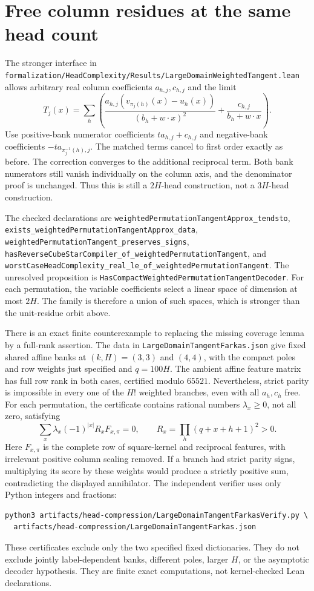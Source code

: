 \documentclass[11pt]{article}
\begin{document}
\section{Free column residues at the same head count}
The stronger interface in
\texttt{formalization/HeadComplexity/Results/LargeDomainWeightedTangent.lean}
allows arbitrary real column coefficients $a_{h,j},c_{h,j}$ and the limit
\[
 T_j(x)=\sum_h\left(
 \frac{a_{h,j}(v_{\pi_j(h)}(x)-u_h(x))}{(b_h+w\cdot x)^2}
 +\frac{c_{h,j}}{b_h+w\cdot x}\right).
\]
Use positive-bank numerator coefficients $t a_{h,j}+c_{h,j}$ and
negative-bank coefficients $-t a_{\pi_j^{-1}(h),j}$. The matched terms
cancel to first order exactly as before. The correction converges to the
additional reciprocal term. Both bank numerators still vanish individually
on the column axis, and the denominator proof is unchanged. Thus this is
still a $2H$-head construction, not a $3H$-head construction.

The checked declarations are
\texttt{weightedPermutationTangentApprox\_tendsto},
\texttt{exists\_weightedPermutationTangentApprox\_data},
\texttt{weightedPermutationTangent\_preserves\_signs},
\texttt{hasReverseCubeStarCompiler\_of\_weightedPermutationTangent}, and
\texttt{worstCaseHeadComplexity\_real\_le\_of\_weightedPermutationTangent}.
The unresolved proposition is
\texttt{HasCompactWeightedPermutationTangentDecoder}.
For each permutation, the variable coefficients select a linear space of
dimension at most $2H$. The family is therefore a union of such spaces,
which is stronger than the unit-residue orbit above.

There is an exact finite counterexample to replacing the missing coverage
lemma by a full-rank assertion. The data in
\texttt{LargeDomainTangentFarkas.json} give fixed shared affine banks at
$(k,H)=(3,3)$ and $(4,4)$, with the compact poles and row weights just
specified and $q=100H$. The ambient affine feature matrix has full row
rank in both cases, certified modulo $65521$. Nevertheless, strict parity
is impossible in every one of the $H!$ weighted branches, even with all
$a_h,c_h$ free.
For each permutation, the certificate contains rational numbers
$\lambda_x\geq0$, not all zero, satisfying
\[
 \sum_x\lambda_x(-1)^{|x|}R_xF_{x,\pi}=0,
 \qquad R_x=\prod_h(q+x+h+1)^2>0.
\]
Here $F_{x,\pi}$ is the complete row of square-kernel and reciprocal
features, with irrelevant positive column scaling removed. If a branch
had strict parity signs, multiplying its score by these weights would
produce a strictly positive sum, contradicting the displayed annihilator.
The independent verifier uses only Python integers and fractions:
\begin{verbatim}
python3 artifacts/head-compression/LargeDomainTangentFarkasVerify.py \
  artifacts/head-compression/LargeDomainTangentFarkas.json
\end{verbatim}
These certificates exclude only the two specified fixed dictionaries.
They do not exclude jointly label-dependent banks, different poles, larger
$H$, or the asymptotic decoder hypothesis. They are finite exact
computations, not kernel-checked Lean declarations.
\end{document}

